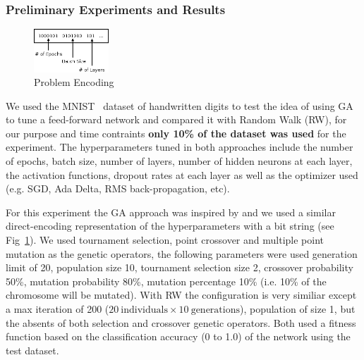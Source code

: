 \subsubsection{Preliminary Experiments and Results}

\begin{figure}
	\centering
	\includegraphics[width=0.25\textwidth]{sections/imgs/ga/ga_encoding.png}
	\caption{Problem Encoding}
	\label{fig:ga_encoding}
\end{figure}

We used the MNIST~\cite{lecun1998mnist} dataset of handwritten digits to test the idea of using GA to tune a feed-forward network and compared it with Random Walk (RW), for our purpose and time contraints \textbf{only 10\% of the dataset was used} for the experiment. The hyperparameters tuned in both approaches include the number of epochs, batch size, number of layers, number of hidden neurons at each layer, the activation functions, dropout rates at each layer as well as the optimizer used (e.g. SGD, Ada Delta, RMS back-propagation, etc). 

For this experiment the GA approach was inspired by \cite{whitley1990genetic} and we used a similar direct-encoding representation of the hyperparameters with a bit string (see Fig~\ref{fig:ga_encoding}). We used tournament selection, point crossover and multiple point mutation as the genetic operators, the following parameters were used generation limit of 20, population size 10, tournament selection size 2, crossover probability 50\%, mutation probability 80\%, mutation percentage 10\% (i.e. 10\% of the chromosome will be mutated). With RW the configuration is very similiar except a max iteration of 200 ($20~\text{individuals} \times 10~\text{generations}$), population of size 1, but the absents of both selection and crossover genetic operators. Both used a fitness function based on the classification accuracy (0 to 1.0) of the network using the test dataset.


